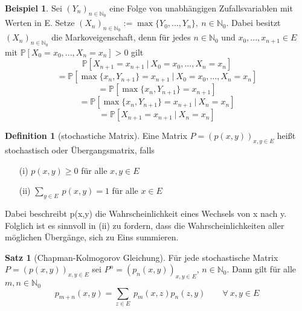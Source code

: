 \documentclass[a4paper,12pt]{scrartcl}
\theoremstyle{definition}
\newtheorem{sat}{Satz}[section]
\newtheorem{bsp}{Beispiel}[section]
\newtheorem{defi}{Definition}[section]
\begin{document}
\begin{bsp}
Sei $(Y_{n})_{n \in \mathbb{N}_{0}}$ eine Folge von unabhängigen Zufallsvariablen mit Werten in E. Setze $(X_{n})_{n \in \mathbb{N}_{0}} := \max \lbrace Y_{0},...,Y_{n} \rbrace, \: n \in \mathbb{N}_{0}$. Dabei besitzt $(X_{n})_{n \in \mathbb{N}_{0}}$ die Markoveigenschaft, denn für jedes $n \in \mathbb{N}_{0}$ und $x_{0},...,x_{n+1} \in E$ mit $\mathbb{P}[X_{0} = x_{0},...,X_{n} = x_{n}]>0$ gilt 
\begin{equation*}
\mathbb{P}[X_{n+1} = x_{n+1} \: | \: X_{0} = x_{0},...,X_{n} = x_{n}]  
\end{equation*}
\begin{equation*}
= \mathbb{P}[\max\lbrace x_{n}, Y_{n+1} \rbrace = x_{n+1} \: | \: X_{0} = x_{0},...,X_{n} = x_{n}]
\end{equation*}
\begin{equation*}
= \mathbb{P}[\max\lbrace x_{n}, Y_{n+1} \rbrace 
= x_{n+1}] 
\end{equation*}
\begin{equation*}
= \mathbb{P}[\max\lbrace x_{n}, Y_{n+1} \rbrace = x_{n+1} \: | \: X_{n} = x_{n}] 
\end{equation*}
\begin{equation*}
= \mathbb{P}[X_{n+1} = x_{n+1} \: | \: X_{n} = x_{n}]
\end{equation*}
\end{bsp}
\begin{defi}[stochastiche Matrix]
Eine Matrix $P=(p(x,y))_{x,y \in E}$ heißt stochastisch oder Übergangsmatrix, falls
\begin{itemize}
\item[(i)] $p(x,y) \ge 0$ für alle $x,y \in E$
\item[(ii)] $\sum_{y \in E} \: p(x,y) = 1$ für alle $x \in E$
\end{itemize}
Dabei beschreibt p(x,y) die Wahrscheinlichkeit eines Wechsels von x nach y. Folglich ist es sinnvoll in (ii) zu fordern, dass die Wahrscheinlichkeiten aller möglichen Übergänge, sich zu Eins summieren.
\end{defi}
\begin{sat}[Chapman-Kolmogorov Gleichung]
\label{Chapman-Kolmogorov Gleichung}
Für jede stochastische Matrix $P =(p(x,y))_{x,y \in E}$  sei $P^{n} =(p_{n}(x,y))_{x,y \in E}$, $n \in \mathbb{N}_{0}$. Dann gilt für alle $m,n \in \mathbb{N}_{0}$
\begin{equation*}
p_{m+n} (x,y) = \sum_{z \in E} \: p_{m}(x,z) p_{n}(z,y) \qquad \forall \: x,y \in E
\end{equation*}
\end{sat}
\end{document}
